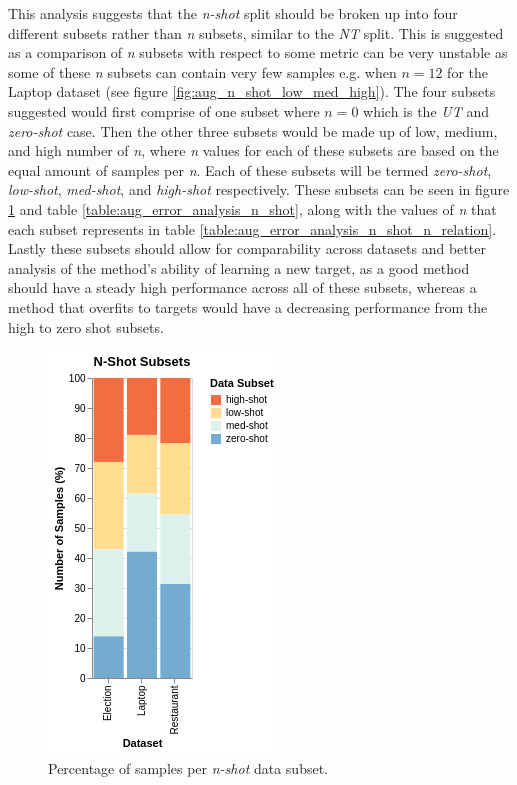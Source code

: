 This analysis suggests that the \textit{n-shot} split should be broken up into four different subsets rather than \textit{n} subsets, similar to the \textit{NT} split. This is suggested as a comparison of \textit{n} subsets with respect to some metric can be very unstable as some of these \textit{n} subsets can contain very few samples e.g. when $n=12$ for the Laptop dataset (see figure \ref{fig:aug_n_shot_low_med_high}). The four subsets suggested would first comprise of one subset where $n=0$ which is the \textit{UT} and \textit{zero-shot} case. Then the other three subsets would be made up of low, medium, and high number of \textit{n}, where \textit{n} values for each of these subsets are based on the equal amount of samples per \textit{n}. Each of these subsets will be termed \textit{zero-shot}, \textit{low-shot}, \textit{med-shot}, and \textit{high-shot} respectively. These subsets can be seen in figure \ref{fig:aug_error_analysis_n_shot_discrete} and table \ref{table:aug_error_analysis_n_shot}, along with the values of \textit{n} that each subset represents in table \ref{table:aug_error_analysis_n_shot_n_relation}. Lastly these subsets should allow for comparability across datasets and better analysis of the method's ability of learning a new target, as a good method should have a steady high performance across all of these subsets, whereas a method that overfits to targets would have a decreasing performance from the high to zero shot subsets.

\begin{figure}[!ht]
    \centering
    \includegraphics[scale=0.5]{images/augmentation/error_analysis/n_shot_discrete.png}
    \caption{Percentage of samples per \textit{n-shot} data subset.}
    \label{fig:aug_error_analysis_n_shot_discrete}
\end{figure}

